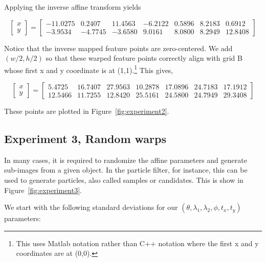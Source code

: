 Applying the inverse affine transform yields

\begin{equation*}
\left[\begin{array}{ccc}
x  
\\ 
y
\end{array}
\right]=
\left[
\begin{array}{rrrrrrrrrrr}
  -11.0275 &   0.2407 &  11.4563 &  -6.2122  &  0.5896 &   8.2183 &   0.6912\\
   -3.9534  & -4.7745  & -3.6580  &  9.0161  &  8.0800  &  8.2949  & 12.8408
\end{array}
\right]
\end{equation*}


Notice that the inverse mapped feature points are zero-centered.  We add $(w/2, h/2)$ so that these warped feature points correctly align with grid B whose first x and y coordinate is at (1,1).\footnote{This uses Matlab notation rather than C++ notation where the first x and y coordinates are at (0,0).}  This gives,

\begin{equation*}
\left[\begin{array}{ccc}
x  
\\ 
y
\end{array}
\right]=
\left[
\begin{array}{rrrrrrrrrrr}
   5.4725  & 16.7407 &  27.9563  & 10.2878  & 17.0896 &  24.7183  & 17.1912 \\
   12.5466 &  11.7255 &  12.8420 &   25.5161 &  24.5800  & 24.7949 &   29.3408
\end{array}
\right]
\end{equation*}

These points are plotted in Figure~\ref{fig:experiment2}.

\subsection{Experiment 3, Random warps}
In many cases, it is required to randomize the affine parameters and generate sub-images from a given object.  In the particle filter, for instance, this can be used to generate particles, also called samples or candidates.  This is show in Figure~\ref{fig:experiment3}.

We start with the following standard deviations for our $(\theta, \lambda_1, \lambda_2, \phi, t_x, t_y)$ parameters:

